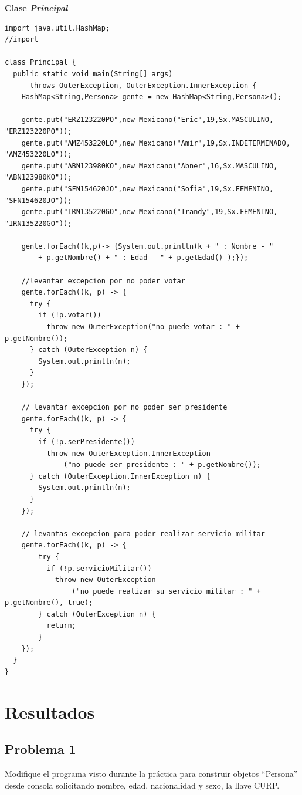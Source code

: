 \documentclass[11pt, twocolumn]{article}
\begin{document}
  \textbf{Clase \textit{Principal}}
  \begin{lstlisting}
import java.util.HashMap;
//import 

class Principal {
  public static void main(String[] args) 
      throws OuterException, OuterException.InnerException {
    HashMap<String,Persona> gente = new HashMap<String,Persona>();

    gente.put("ERZ123220PO",new Mexicano("Eric",19,Sx.MASCULINO, "ERZ123220PO"));
    gente.put("AMZ453220LO",new Mexicano("Amir",19,Sx.INDETERMINADO, "AMZ453220LO"));
    gente.put("ABN123980KO",new Mexicano("Abner",16,Sx.MASCULINO, "ABN123980KO"));
    gente.put("SFN154620JO",new Mexicano("Sofia",19,Sx.FEMENINO, "SFN154620JO"));
    gente.put("IRN135220GO",new Mexicano("Irandy",19,Sx.FEMENINO, "IRN135220GO"));

    gente.forEach((k,p)-> {System.out.println(k + " : Nombre - " 
        + p.getNombre() + " : Edad - " + p.getEdad() );});
    
    //levantar excepcion por no poder votar
    gente.forEach((k, p) -> {
      try {
        if (!p.votar()) 
          throw new OuterException("no puede votar : " + p.getNombre());
      } catch (OuterException n) {
        System.out.println(n);
      }
    });

    // levantar excepcion por no poder ser presidente
    gente.forEach((k, p) -> {
      try {
        if (!p.serPresidente()) 
          throw new OuterException.InnerException
              ("no puede ser presidente : " + p.getNombre());
      } catch (OuterException.InnerException n) {
        System.out.println(n);
      }
    });

    // levantas excepcion para poder realizar servicio militar
    gente.forEach((k, p) -> {
        try {
          if (!p.servicioMilitar()) 
            throw new OuterException
                ("no puede realizar su servicio militar : " + p.getNombre(), true);
        } catch (OuterException n) {
          return;
        }
    });
  }
}    
  \end{lstlisting}

  \section*{Resultados}
  \subsection*{Problema 1}
  Modifique el programa visto durante la práctica para construir objetos ``Persona'' desde consola solicitando nombre, edad, nacionalidad y sexo, la llave CURP.
\end{document}
